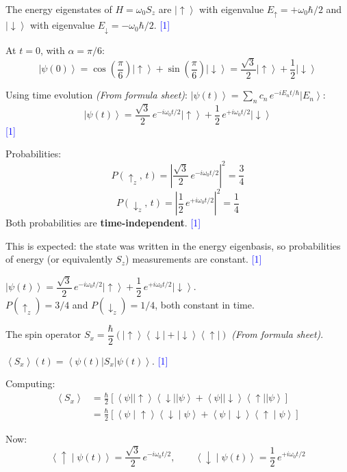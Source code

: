 \documentclass[12pt,a4paper]{article}
\newcommand{\markstep}[1]{\hfill\textcolor{blue}{[#1]}}
\newcommand{\finalanswer}[1]{%
  \begin{tcolorbox}[colback=green!5!white,colframe=green!50!black,boxrule=0.5pt]
  #1
  \end{tcolorbox}
}
\newcommand{\fromsheet}{\textit{(From formula sheet)}}
\renewcommand{\ket}[1]{\left|#1\right\rangle}
\renewcommand{\bra}[1]{\left\langle #1\right|}
\renewcommand{\braket}[2]{\left\langle #1\middle|#2\right\rangle}
\renewcommand{\ketbra}[2]{\left|#1\right\rangle\!\left\langle #2\right|}
\renewcommand{\expect}[1]{\left\langle #1\right\rangle}
\begin{document}
\begin{parts}
\item The energy eigenstates of $H = \omega_0 S_z$ are $\ket{\!\uparrow}$ with eigenvalue $E_\uparrow = +\omega_0\hbar/2$ and $\ket{\!\downarrow}$ with eigenvalue $E_\downarrow = -\omega_0\hbar/2$. \markstep{1}

At $t = 0$, with $\alpha = \pi/6$:
\[
\ket{\psi(0)} = \cos\!\left(\frac{\pi}{6}\right)\ket{\!\uparrow} + \sin\!\left(\frac{\pi}{6}\right)\ket{\!\downarrow} = \frac{\sqrt{3}}{2}\ket{\!\uparrow} + \frac{1}{2}\ket{\!\downarrow}
\]

Using time evolution \fromsheet: $\ket{\psi(t)} = \sum_n c_n\,e^{-iE_n t/\hbar}\ket{E_n}$:
\[
\ket{\psi(t)} = \frac{\sqrt{3}}{2}\,e^{-i\omega_0 t/2}\ket{\!\uparrow} + \frac{1}{2}\,e^{+i\omega_0 t/2}\ket{\!\downarrow}
\]
\markstep{1}

Probabilities:
\[
P(\uparrow_z,\,t) = \left|\frac{\sqrt{3}}{2}\,e^{-i\omega_0 t/2}\right|^2 = \frac{3}{4}
\]
\[
P(\downarrow_z,\,t) = \left|\frac{1}{2}\,e^{+i\omega_0 t/2}\right|^2 = \frac{1}{4}
\]
Both probabilities are \textbf{time-independent}. \markstep{1}

This is expected: the state was written in the energy eigenbasis, so probabilities of energy (or equivalently $S_z$) measurements are constant. \markstep{1}

\finalanswer{$\ket{\psi(t)} = \dfrac{\sqrt{3}}{2}\,e^{-i\omega_0 t/2}\ket{\!\uparrow} + \dfrac{1}{2}\,e^{+i\omega_0 t/2}\ket{\!\downarrow}$.\\[6pt]
$P(\uparrow_z) = 3/4$ and $P(\downarrow_z) = 1/4$, both constant in time.}

\item The spin operator $S_x = \dfrac{\hbar}{2}\left(\ketbra{\!\uparrow}{\downarrow\!} + \ketbra{\!\downarrow}{\uparrow\!}\right)$ \fromsheet.

$\expect{S_x}(t) = \bra{\psi(t)}S_x\ket{\psi(t)}$. \markstep{1}

Computing:
\begin{align*}
\expect{S_x} &= \frac{\hbar}{2}\left[\bra{\psi}\!\ketbra{\!\uparrow}{\downarrow\!}\!\ket{\psi} + \bra{\psi}\!\ketbra{\!\downarrow}{\uparrow\!}\!\ket{\psi}\right] \\
&= \frac{\hbar}{2}\left[\braket{\psi}{\!\uparrow}\braket{\downarrow\!}{\psi} + \braket{\psi}{\!\downarrow}\braket{\uparrow\!}{\psi}\right]
\end{align*}

Now:
\[
\braket{\uparrow\!}{\psi(t)} = \frac{\sqrt{3}}{2}\,e^{-i\omega_0 t/2}, \qquad \braket{\downarrow\!}{\psi(t)} = \frac{1}{2}\,e^{+i\omega_0 t/2}
\]


\end{parts}
\end{document}
